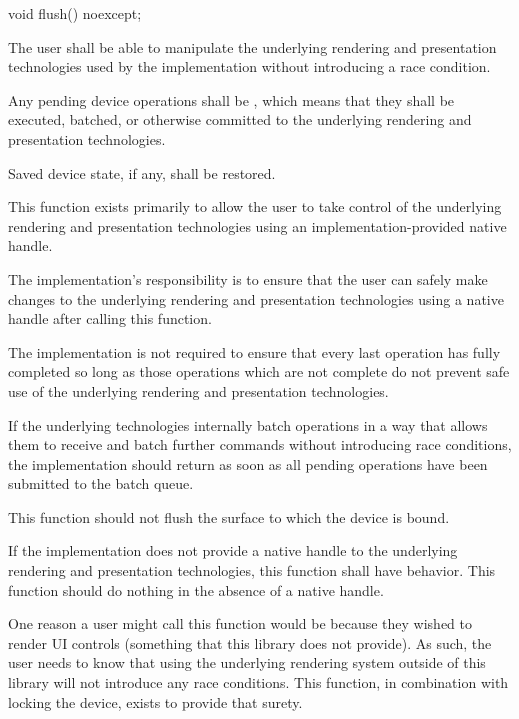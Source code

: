 \begin{itemdecl}
void flush() noexcept;
\end{itemdecl}
\begin{itemdescr}
	\pnum
	\effects
	The user shall be able to manipulate the underlying rendering and 
	presentation technologies used by the implementation without introducing a 
	race condition.
	
	\pnum
	\postconditions
	Any pending device operations shall be , which means that they shall be executed, batched, or otherwise committed to the underlying rendering and presentation technologies.
	
	\pnum 
	Saved device state, if any, shall be restored.

	\pnum
	\remarks
	This function exists primarily to allow the user to take control of the 
	underlying rendering and presentation technologies using an 
	implementation-provided native handle.
	
	\pnum
	The implementation's responsibility is to ensure that the user can safely make changes to the underlying rendering and presentation technologies using a native handle after calling this function.
	
	\pnum
	The implementation is not required to ensure that every last operation has fully completed so long as those operations which are not complete do not prevent safe use of the underlying rendering and presentation technologies.

	\pnum
	If the underlying technologies internally batch operations in a way that allows them to receive and batch further commands without introducing race conditions, the implementation should return as soon as all pending operations have been submitted to the batch queue.
	
	\pnum
	This function should not flush the surface to which the device is bound.
	
	\pnum
	If the implementation does not provide a native handle to the underlying rendering and presentation technologies, this function shall have  behavior. This function should do nothing in the absence of a native handle.
	
	\pnum
	\realnotes
	One reason a user might call this function would be because they wished to 
	render UI controls (something that this library does not provide). As such, the user needs to know that using the underlying rendering system outside of this library will not introduce any race conditions. This function, in combination with locking the device, exists to provide that surety.
\end{itemdescr}

